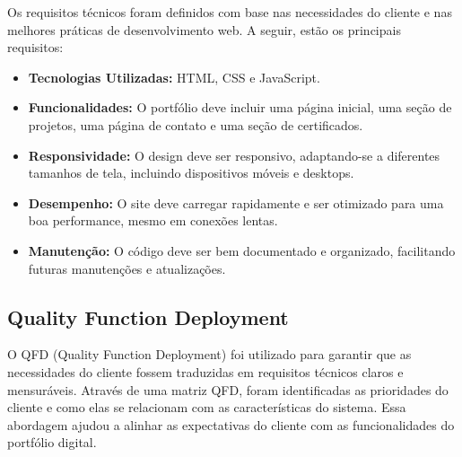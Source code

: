 Os requisitos técnicos foram definidos com base nas necessidades do cliente e nas melhores práticas de desenvolvimento web. A seguir, estão os principais requisitos:
\begin{itemize}
    \item \textbf{Tecnologias Utilizadas:} HTML, CSS e JavaScript.
    \item \textbf{Funcionalidades:} O portfólio deve incluir uma página inicial, uma seção de projetos, uma página de contato e uma seção de certificados.
    \item \textbf{Responsividade:} O design deve ser responsivo, adaptando-se a diferentes tamanhos de tela, incluindo dispositivos móveis e desktops.
    \item \textbf{Desempenho:} O site deve carregar rapidamente e ser otimizado para uma boa performance, mesmo em conexões lentas.
    \item \textbf{Manutenção:} O código deve ser bem documentado e organizado, facilitando futuras manutenções e atualizações.
\end{itemize}

\subsection{Quality Function Deployment}

O QFD (Quality Function Deployment) foi utilizado para garantir que as necessidades do cliente fossem traduzidas em requisitos técnicos claros e mensuráveis. Através de uma matriz QFD, foram identificadas as prioridades do cliente e como elas se relacionam com as características do sistema. Essa abordagem ajudou a alinhar as expectativas do cliente com as funcionalidades do portfólio digital.



